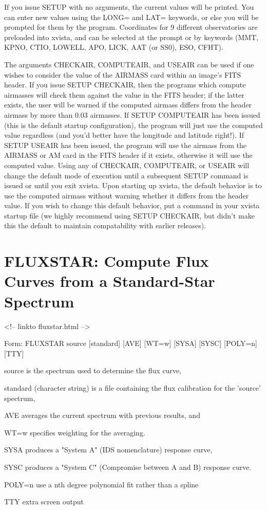 If you issue SETUP with no arguments, the current values will be printed.
You can enter new values using the LONG= and LAT= keywords, or else you
will be prompted for them by the program. Coordinates for 9 different
observatories are preloaded into xvista, and can be selected at the
prompt or by keywords (MMT, KPNO, CTIO, LOWELL, APO, LICK, AAT (or SS0),
ESO, CFHT).

The arguments CHECKAIR, COMPUTEAIR, and USEAIR can be used if one wishes
to consider the value of the AIRMASS card within an image's FITS header.
If you issue SETUP CHECKAIR, then the programs which compute airmasses will
check them against the value in the FITS header; if the latter exists, the
user will be warned if the computed airmass differs from the header airmass
by more than 0.03 airmasses. If SETUP COMPUTEAIR has been issued (this is
the default startup configuration), the program will just use the computed
value regardless (and you'd better have the longitude and latitude right!).
If SETUP USEAIR has been issued, the program will use the airmass from the
AIRMASS or AM card in the FITS header if it exists, otherwise it will use
the computed value. Using any of CHECKAIR, COMPUTEAIR, or USEAIR will change
the default mode of execution until a subsequent SETUP command is issued or
until you exit xvista. Upon starting up xvista, the default behavior is
to use the computed airmass without warning whether it differs from the
header value. If you wish to change this default behavior, put a command
in your xvista startup file (we highly recommend using SETUP CHECKAIR, but
didn't make this the default to maintain compatability with earlier releases).

\section{FLUXSTAR: Compute Flux Curves from a Standard-Star Spectrum}
\begin{rawhtml}
<!-- linkto fluxstar.html -->
\end{rawhtml}
\begin{command}
  \item[Form: FLUXSTAR source {[standard]} {[AVE]} {[WT=w]} {[SYSA]} {[SYSC]}
       {[POLY=n]} {[TTY]}\hfill]{}
  \item[source]{is the spectrum used to determine the flux curve,}
  \item[standard]{(character string) is a file 
       containing the flux calibration for the 'source' spectrum,}
  \item[AVE]{averages the current spectrum with previous results, and}
  \item[WT=w]{specifies weighting for the averaging.}
  \item[SYSA]{produces a "System A" (IDS nomenclature) response curve,}
  \item[SYSC]{produces a "System C" (Compromise between A and B) response 
       curve.}
  \item[POLY=n]{use a nth degree polynomial fit rather than a spline}
  \item[TTY]{extra screen output}
\end{command}

